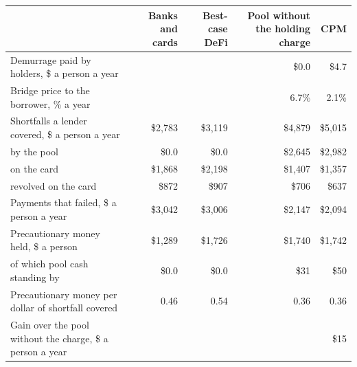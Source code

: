 \begin{tabular}{lrrrr}
\toprule
 & Banks and cards & Best-case DeFi & Pool without the holding charge & CPM \\
\midrule
Demurrage paid by holders, \$ a person a year &  &  & \$0.0 & \$4.7 \\
Bridge price to the borrower, \% a year &  &  & 6.7\% & 2.1\% \\
Shortfalls a lender covered, \$ a person a year & \$2{,}783 & \$3{,}119 & \$4{,}879 & \$5{,}015 \\
\quad by the pool & \$0.0 & \$0.0 & \$2{,}645 & \$2{,}982 \\
\quad on the card & \$1{,}868 & \$2{,}198 & \$1{,}407 & \$1{,}357 \\
\quad revolved on the card & \$872 & \$907 & \$706 & \$637 \\
Payments that failed, \$ a person a year & \$3{,}042 & \$3{,}006 & \$2{,}147 & \$2{,}094 \\
Precautionary money held, \$ a person & \$1{,}289 & \$1{,}726 & \$1{,}740 & \$1{,}742 \\
\quad of which pool cash standing by & \$0.0 & \$0.0 & \$31 & \$50 \\
Precautionary money per dollar of shortfall covered & 0.46 & 0.54 & 0.36 & 0.36 \\
Gain over the pool without the charge, \$ a person a year &  &  &  & \$15 \\
\bottomrule
\end{tabular}
